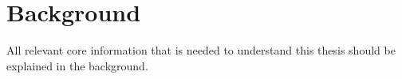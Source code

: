\chapter{Background}\label{ch:whitebox}

All relevant core information that is needed to understand this thesis should be explained in the background.
